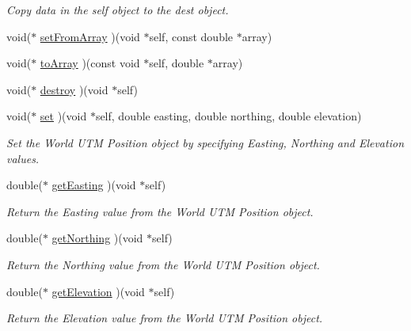 \begin{CompactItemize}
\begin{CompactList}\small\item\em Copy data in the self object to the dest object. \item\end{CompactList}\item 
void($\ast$ \hyperlink{structdrdc__WUTMPosn__t_f59044680829cd0f12c9a3de49911bae}{setFromArray} )(void $\ast$self, const double $\ast$array)
\item 
void($\ast$ \hyperlink{structdrdc__WUTMPosn__t_4577590d5ad73c7e7522d38821c5fcc8}{toArray} )(const void $\ast$self, double $\ast$array)
\item 
void($\ast$ \hyperlink{structdrdc__WUTMPosn__t_3e3ff4cfa5adb3de52bd4519d8e3f65b}{destroy} )(void $\ast$self)
\item 
void($\ast$ \hyperlink{structdrdc__WUTMPosn__t_f532b3b39c957ac058ec88a372a53c3a}{set} )(void $\ast$self, double easting, double northing, double elevation)
\begin{CompactList}\small\item\em Set the World UTM Position object by specifying Easting, Northing and Elevation values. \item\end{CompactList}\item 
double($\ast$ \hyperlink{structdrdc__WUTMPosn__t_64ffface39fd90112695fb3e0d26b587}{getEasting} )(void $\ast$self)
\begin{CompactList}\small\item\em Return the Easting value from the World UTM Position object. \item\end{CompactList}\item 
double($\ast$ \hyperlink{structdrdc__WUTMPosn__t_d68032235695b2ced53538e02e090b75}{getNorthing} )(void $\ast$self)
\begin{CompactList}\small\item\em Return the Northing value from the World UTM Position object. \item\end{CompactList}\item 
double($\ast$ \hyperlink{structdrdc__WUTMPosn__t_26cca9bcac6e57ce316839fd7bbe4fee}{getElevation} )(void $\ast$self)
\begin{CompactList}\small\item\em Return the Elevation value from the World UTM Position object. \item\end{CompactList}\item 

\end{CompactItemize}
